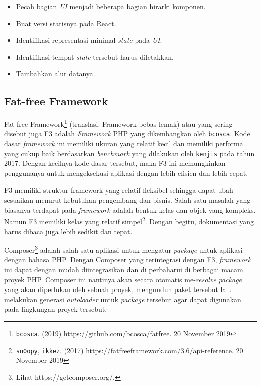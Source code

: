     \begin{itemize}
        \item Pecah bagian \textit{UI} menjadi beberapa bagian hirarki komponen.
        
        \item Buat versi statisnya pada React.
        
        \item Identifikasi representasi minimal \textit{state} pada \textit{UI}.
        
        \item Identifikasi tempat \textit{state} tersebut harus diletakkan.
        
        \item Tambahkan alur datanya.
    \end{itemize}
    

\subsection{Fat-free Framework}
    Fat-free Framework\footnote{\texttt{bcosca}. (2019) https://github.com/bcosca/fatfree. 20 November 2019} (translasi: Framework bebas lemak) atau yang sering disebut juga F3 adalah \textit{Framework} PHP yang dikembangkan oleh \texttt{bcosca}. Kode dasar \textit{framework} ini memiliki ukuran yang relatif kecil dan memiliki performa yang cukup baik berdasarkan \textit{benchmark} yang dilakukan oleh \texttt{kenjis} pada tahun 2017\cite{kenjis:framework-benchmark}. Dengan kecilnya kode dasar tersebut, maka F3 ini memungkinkan penggunanya untuk mengeksekusi aplikasi dengan lebih efisien dan lebih cepat.
    
    F3 memiliki struktur framework yang relatif fleksibel sehingga dapat ubah-sesuaikan menurut kebutuhan pengembang dan bisnis.
    Salah satu masalah yang biasanya terdapat pada \textit{framework} adalah bentuk kelas dan objek yang kompleks.
    Namun F3 memiliki kelas yang relatif simpel\footnote{\texttt{sn0opy}, \texttt{ikkez}. (2017) https://fatfreeframework.com/3.6/api-reference. 20 November 2019}.
    Dengan begitu, dokumentasi yang harus dibaca juga lebih sedikit dan tepat.
    
    Composer\footnote{Lihat https://getcomposer.org/.} adalah salah satu aplikasi untuk mengatur \textit{package} untuk aplikasi dengan bahasa PHP.
    Dengan Composer yang terintegrasi dengan F3, \textit{framework} ini dapat dengan mudah diintegrasikan dan di perbaharui di berbagai macam proyek PHP.  Composer ini nantinya akan secara otomatis me-\textit{resolve} \textit{package} yang akan diperlukan oleh sebuah proyek, mengunduh paket tersebut lalu melakukan generasi \textit{autoloader} untuk \textit{package} tersebut agar dapat digunakan pada lingkungan proyek tersebut.

